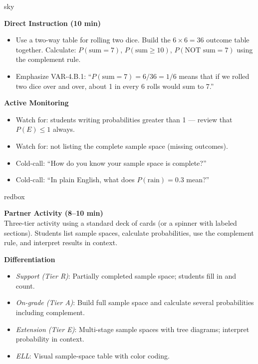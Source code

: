 \documentclass[10pt]{article}
\begin{document}
\begin{skillbox}{sky}
\begin{minipage}[t]{0.48\linewidth}
    \textbf{Direct Instruction (10 min)}
    \begin{itemize}
        \item Use a two-way table for rolling two dice. Build the $6 \times 6 = 36$ outcome
              table together. Calculate: $P(\text{sum} = 7)$, $P(\text{sum} \geq 10)$,
              $P(\text{NOT sum} = 7)$ using the complement rule.
        \item Emphasize VAR-4.B.1: ``$P(\text{sum} = 7) = 6/36 = 1/6$ means that if we
              rolled two dice over and over, about 1 in every 6 rolls would sum to 7.''
    \end{itemize}
\end{minipage}
\hfill
\begin{minipage}[t]{0.48\linewidth}
    \textbf{Active Monitoring}
    \begin{itemize}
        \item Watch for: students writing probabilities greater than 1 --- review that
              $P(E) \leq 1$ always.
        \item Watch for: not listing the complete sample space (missing outcomes).
        \item Cold-call: ``How do you know your sample space is complete?''
        \item Cold-call: ``In plain English, what does $P(\text{rain}) = 0.3$ mean?''
    \end{itemize}
\end{minipage}
\end{skillbox}

\begin{skillbox}{redbox}
\begin{minipage}[t]{0.48\linewidth}
    \textbf{Partner Activity (8--10 min)}\\
    Three-tier activity using a standard deck of cards (or a spinner with labeled
    sections). Students list sample spaces, calculate probabilities, use the
    complement rule, and interpret results in context.
\end{minipage}
\hfill
\begin{minipage}[t]{0.48\linewidth}
    \textbf{Differentiation}
    \begin{itemize}
        \item \textit{Support (Tier R)}: Partially completed sample space; students
              fill in and count.
        \item \textit{On-grade (Tier A)}: Build full sample space and calculate several
              probabilities including complement.
        \item \textit{Extension (Tier E)}: Multi-stage sample spaces with tree diagrams;
              interpret probability in context.
        \item \textit{ELL}: Visual sample-space table with color coding.
    \end{itemize}
\end{minipage}
\end{skillbox}
\end{document}
